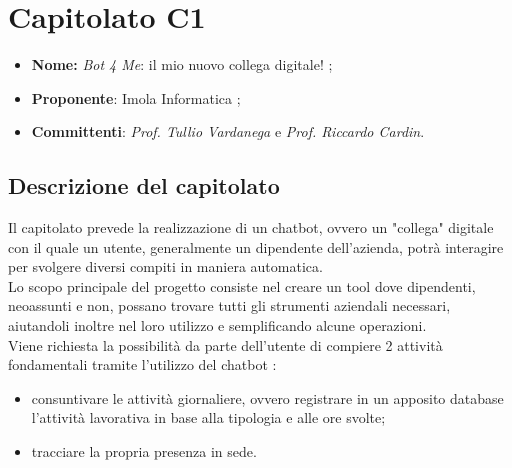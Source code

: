 \section{Capitolato C1}
\begin{itemize}
	\item \textbf{Nome:} \textit{Bot 4 Me}: il mio nuovo collega digitale! ;
	\item \textbf{Proponente}: Imola Informatica ;
	\item \textbf{Committenti}: \textit{Prof. Tullio Vardanega} e \textit{Prof. Riccardo Cardin}.
\end{itemize}
\subsection{Descrizione del capitolato}
Il capitolato prevede la realizzazione di un chatbot, ovvero un "collega" digitale con il quale un utente, generalmente un dipendente dell'azienda, potrà interagire per svolgere diversi compiti in maniera automatica. 
\\Lo scopo principale del progetto consiste nel creare un tool dove dipendenti, neoassunti e non, possano trovare tutti gli strumenti aziendali necessari, aiutandoli inoltre nel loro utilizzo e semplificando alcune operazioni.
\\Viene richiesta la possibilità da parte dell'utente di compiere 2 attività fondamentali tramite l'utilizzo del chatbot :
\begin{itemize}
	\item consuntivare le attività giornaliere, ovvero registrare in un apposito database l'attività lavorativa in base alla tipologia e alle ore svolte;
	\item tracciare la propria presenza in sede.
\end{itemize}
